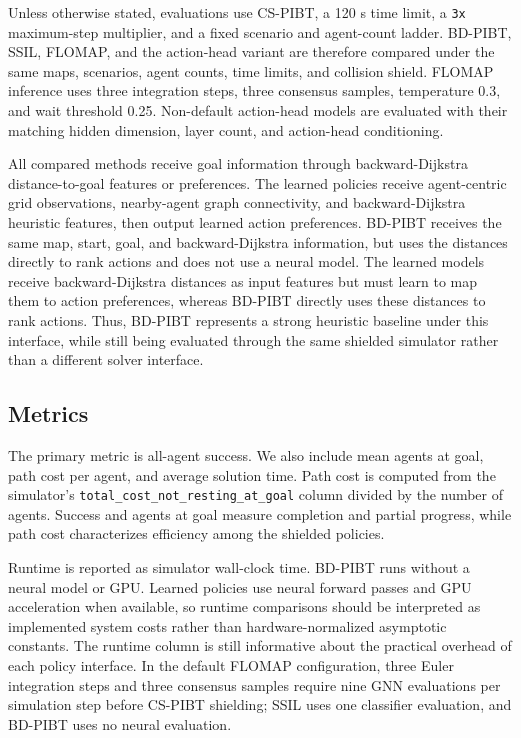 \documentclass[conference]{IEEEtran}
\begin{document}
Unless otherwise stated, evaluations use CS-PIBT, a 120 s time limit, a
\texttt{3x} maximum-step multiplier, and a fixed scenario and agent-count
ladder.  BD-PIBT, SSIL, FLOMAP, and the action-head variant are therefore
compared under the same maps, scenarios, agent counts, time limits, and
collision shield.  FLOMAP inference uses three integration steps, three
consensus samples, temperature 0.3, and wait threshold 0.25.  Non-default
action-head models are evaluated with their matching hidden dimension, layer
count, and action-head conditioning.

All compared methods receive goal information through backward-Dijkstra
distance-to-goal features or preferences.  The learned policies receive
agent-centric grid observations, nearby-agent graph connectivity, and
backward-Dijkstra heuristic features, then output learned action preferences.
BD-PIBT receives the same map, start, goal, and backward-Dijkstra information,
but uses the distances directly to rank actions and does not use a neural model.
The learned models receive backward-Dijkstra distances as input features but
must learn to map them to action preferences, whereas BD-PIBT directly uses
these distances to rank actions.  Thus, BD-PIBT represents a strong heuristic
baseline under this interface, while still being evaluated through the same
shielded simulator rather than a different solver interface.

\subsection{Metrics}

The primary metric is all-agent success.  We also include mean agents at
goal, path cost per agent, and average solution time.  Path cost is computed
from the simulator's \texttt{total\_cost\_not\_resting\_at\_goal} column divided
by the number of agents.  Success and agents at goal measure completion and
partial progress, while path cost characterizes efficiency among the shielded
policies.

Runtime is reported as simulator wall-clock time.  BD-PIBT runs without a neural
model or GPU.  Learned policies use neural forward passes and GPU acceleration
when available, so runtime comparisons should be interpreted as implemented
system costs rather than hardware-normalized asymptotic constants.  The runtime
column is still informative about the practical overhead of each policy
interface.  In the default FLOMAP configuration, three Euler integration steps
and three consensus samples require nine GNN evaluations per simulation step
before CS-PIBT shielding; SSIL uses one classifier evaluation, and BD-PIBT uses
no neural evaluation.
\end{document}
